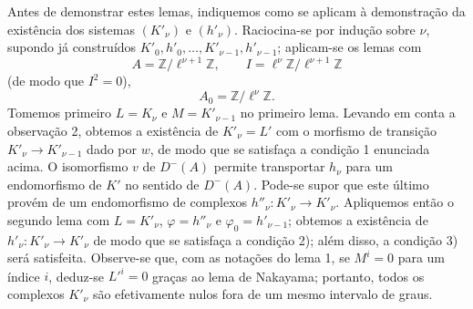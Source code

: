 Antes de demonstrar estes lemas, indiquemos como se aplicam à demonstração da existência dos sistemas $(K'_\nu)$ e $(h'_\nu)$. Raciocina-se por indução sobre $\nu$, supondo já construídos $K'_0,h'_0,\ldots,K'_{\nu-1},h'_{\nu-1}$; aplicam-se os lemas com
\[
A=\mathbb Z/\ell^{\nu+1}\mathbb Z,
\qquad
I=\ell^\nu\mathbb Z/\ell^{\nu+1}\mathbb Z
\]
(de modo que $I^2=0$),
\[
A_0=\mathbb Z/\ell^\nu\mathbb Z.
\]
Tomemos primeiro $L=K_\nu$ e $M=K'_{\nu-1}$ no primeiro lema. Levando em conta a observação 2, obtemos a existência de $K'_\nu=L'$ com o morfismo de transição $K'_\nu\to K'_{\nu-1}$ dado por $w$, de modo que se satisfaça a condição 1 enunciada acima. O isomorfismo $v$ de $D^-(A)$ permite transportar $h_\nu$ para um endomorfismo de $K'$ no sentido de $D^-(A)$. Pode-se supor que este último provém de um endomorfismo de complexos $h''_\nu:K'_\nu\to K'_\nu$. Apliquemos então o segundo lema com $L=K'_\nu$, $\varphi=h''_\nu$ e $\varphi_0=h'_{\nu-1}$; obtemos a existência de $h'_\nu:K'_\nu\to K'_\nu$ de modo que se satisfaça a condição 2); além disso, a condição 3) será satisfeita. Observe-se que, com as notações do lema 1, se $M^i=0$ para um índice $i$, deduz-se $L'^i=0$ graças ao lema de Nakayama; portanto, todos os complexos $K'_\nu$ são efetivamente nulos fora de um mesmo intervalo de graus.
